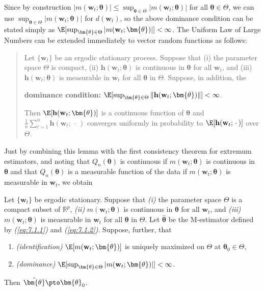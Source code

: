 Since by construction $|m(\mathbf{w}_t; \bm{\theta})| \leq \sup_{\bm{\theta} \in \Theta} |m(\mathbf{w}_t; \bm{\theta})|$ for all $\bm{\theta} \in \Theta$, we can use $\sup_{\bm{\theta} \in \Theta} |m(\mathbf{w}_t; \bm{\theta})|$ for $d(\mathbf{w}_t)$, so the above dominance condition can be stated simply as $\E[\sup_{\bm{\theta} \in \Theta} |m(\mathbf{w}_t; \bm{\theta})|] < \infty$. The Uniform Law of Large Numbers can be extended immediately to vector random functions as follows:

\begin{quote}
Let $\{\mathbf{w}_t\}$ be an ergodic stationary process. Suppose that (i) the parameter space $\Theta$ is compact, (ii) $\mathbf{h}(\mathbf{w}_t; \bm{\theta})$ is continuous in $\bm{\theta}$ for all $\mathbf{w}_t$, and (iii) $\mathbf{h}(\mathbf{w}_t; \bm{\theta})$ is measurable in $\mathbf{w}_t$ for all $\bm{\theta}$ in $\Theta$. Suppose, in addition, the

\textbf{dominance condition:} $\E[\sup_{\bm{\theta} \in \Theta} \| \mathbf{h}(\mathbf{w}_t; \bm{\theta}) \|] < \infty$.

Then $\E[\mathbf{h}(\mathbf{w}_t; \bm{\theta})]$ is a continuous function of $\bm{\theta}$ and $\frac{1}{n}\sum_{t=1}^{n} \mathbf{h}(\mathbf{w}_t; \,\cdot\,)$ converges uniformly in probability to $\E[\mathbf{h}(\mathbf{w}_t; \,\cdot\,)]$ over $\Theta$.
\end{quote}

Just by combining this lemma with the first consistency theorem for extremum estimators, and noting that $Q_n(\bm{\theta})$ is continuous if $m(\mathbf{w}_t; \bm{\theta})$ is continuous in $\bm{\theta}$ and that $Q_n(\bm{\theta})$ is a measurable function of the data if $m(\mathbf{w}_t; \bm{\theta})$ is measurable in $\mathbf{w}_t$, we obtain

\begin{proposition}
\label{prop:7.3}
Let $\{\mathbf{w}_t\}$ be ergodic stationary. Suppose that \emph{(i)} the parameter space $\Theta$ is a compact subset of $\mathbb{R}^p$, \emph{(ii)} $m(\mathbf{w}_t; \bm{\theta})$ is continuous in $\bm{\theta}$ for all $\mathbf{w}_t$, and \emph{(iii)} $m(\mathbf{w}_t; \bm{\theta})$ is measurable in $\mathbf{w}_t$ for all $\bm{\theta}$ in $\Theta$. Let $\hat{\bm{\theta}}$ be the M-estimator defined by \emph{(\ref{eq:7.1.1})} and \emph{(\ref{eq:7.1.2})}. Suppose, further, that
\begin{enumerate}[label=(\alph*)]
\item \emph{(identification)} \enspace $\E[m(\mathbf{w}_t; \bm{\theta})]$ is uniquely maximized on $\Theta$ at $\bm{\theta}_0 \in \Theta$,
\item \emph{(dominance)} \enspace $\E[\sup_{\bm{\theta} \in \Theta} |m(\mathbf{w}_t; \bm{\theta})|] < \infty$.
\end{enumerate}
Then $\hat{\bm{\theta}} \pto \bm{\theta}_0$.
\end{proposition}

